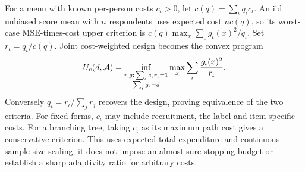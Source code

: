 For a menu with known per-person costs $c_\iota>0$, let $c(q)=\sum_\iota q_\iota c_\iota$. An iid unbiased score mean with $n$ respondents uses expected cost $nc(q)$, so its worst-case MSE-times-cost upper criterion is $c(q)\max_x\sum_\iota g_\iota(x)^2/q_\iota$. Set $r_\iota=q_\iota/c(q)$. Joint cost-weighted design becomes the convex program
\[
 U_c(d,\mathcal A)=\inf_{\substack{r,g:\,\sum_\iota c_\iota r_\iota=1\\ \sum_\iota g_\iota=d}}
              \max_x\sum_\iota\frac{g_\iota(x)^2}{r_\iota}.
\]
Conversely $q_\iota=r_\iota/\sum_jr_j$ recovers the design, proving equivalence of the two criteria. For fixed forms, $c_\iota$ may include recruitment, the label and item-specific costs. For a branching tree, taking $c_\iota$ as its maximum path cost gives a conservative criterion. This uses expected total expenditure and continuous sample-size scaling; it does not impose an almost-sure stopping budget or establish a sharp adaptivity ratio for arbitrary costs.
